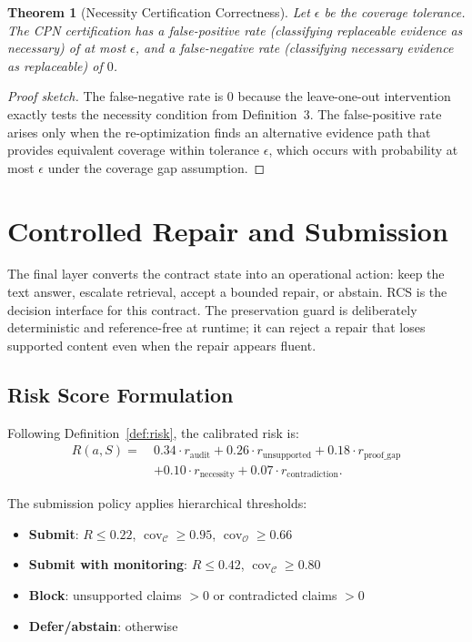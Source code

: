 \documentclass[journal,onecolumn,11pt]{IEEEtran}
\newtheorem{theorem}{Theorem}
\begin{document}
\begin{theorem}[Necessity Certification Correctness]
\label{thm:cpn}
Let $\epsilon$ be the coverage tolerance. The CPN certification has a false-positive rate (classifying replaceable evidence as necessary) of at most $\epsilon$, and a false-negative rate (classifying necessary evidence as replaceable) of $0$.
\end{theorem}

\begin{proof}[Proof sketch]
The false-negative rate is $0$ because the leave-one-out intervention exactly tests the necessity condition from Definition~3. The false-positive rate arises only when the re-optimization finds an alternative evidence path that provides equivalent coverage within tolerance $\epsilon$, which occurs with probability at most $\epsilon$ under the coverage gap assumption.
\end{proof}


\section{Controlled Repair and Submission}
\label{sec:rcs}

The final layer converts the contract state into an operational action: keep the text answer, escalate retrieval, accept a bounded repair, or abstain. RCS is the decision interface for this contract. The preservation guard is deliberately deterministic and reference-free at runtime; it can reject a repair that loses supported content even when the repair appears fluent.

\subsection{Risk Score Formulation}

Following Definition~\ref{def:risk}, the calibrated risk is:
\begin{align}
R(a, S) =\ & 0.34 \cdot r_{\text{audit}} + 0.26 \cdot r_{\text{unsupported}} + 0.18 \cdot r_{\text{proof\_gap}} \nonumber \\
& + 0.10 \cdot r_{\text{necessity}} + 0.07 \cdot r_{\text{contradiction}}.
\end{align}

The submission policy applies hierarchical thresholds:
\begin{itemize}
\item \textbf{Submit}: $R \leq 0.22$, $\operatorname{cov}_{\mathcal{C}} \geq 0.95$, $\operatorname{cov}_{\mathcal{O}} \geq 0.66$
\item \textbf{Submit with monitoring}: $R \leq 0.42$, $\operatorname{cov}_{\mathcal{C}} \geq 0.80$
\item \textbf{Block}: unsupported claims $> 0$ or contradicted claims $> 0$
\item \textbf{Defer/abstain}: otherwise
\end{itemize}
\end{document}
